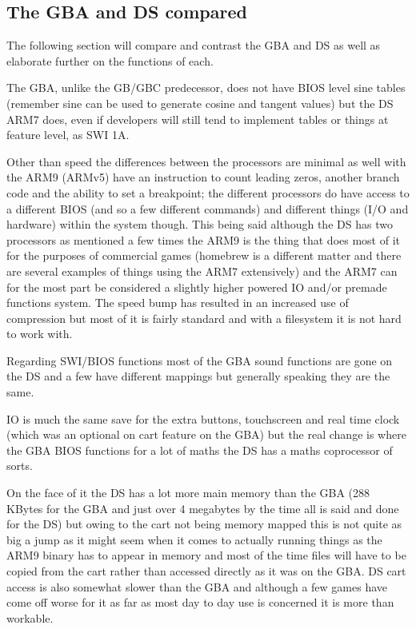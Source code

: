 \documentclass[
]{book}
\begin{document}
\hypertarget{the-gba-and-ds-compared}{%
\subsection{The GBA and DS compared}\label{the-gba-and-ds-compared}}

The following section will compare and contrast the GBA and DS as well as elaborate further on the functions of each.

The GBA, unlike the GB/GBC predecessor, does not have BIOS level sine tables (remember sine can be used to generate cosine and tangent values) but the DS ARM7 does, even if developers will still tend to implement tables or things at feature level, as SWI 1A.

Other than speed the differences between the processors are minimal as well with the ARM9 (ARMv5) have an instruction to count leading zeros, another branch code and the ability to set a breakpoint; the different processors do have access to a different BIOS (and so a few different commands) and different things (I/O and hardware) within the system though. This being said although the DS has two processors as mentioned a few times the ARM9 is the thing that does most of it for the purposes of commercial games (homebrew is a different matter and there are several examples of things using the ARM7 extensively) and the ARM7 can for the most part be considered a slightly higher powered IO and/or premade functions system. The speed bump has resulted in an increased use of compression but most of it is fairly standard and with a filesystem it is not hard to work with.

Regarding SWI/BIOS functions most of the GBA sound functions are gone on the DS and a few have different mappings but generally speaking they are the same.

IO is much the same save for the extra buttons, touchscreen and real time clock (which was an optional on cart feature on the GBA) but the real change is where the GBA BIOS functions for a lot of maths the DS has a maths coprocessor of sorts.

On the face of it the DS has a lot more main memory than the GBA (288 KBytes for the GBA and just over 4 megabytes by the time all is said and done for the DS) but owing to the cart not being memory mapped this is not quite as big a jump as it might seem when it comes to actually running things as the ARM9 binary has to appear in memory and most of the time files will have to be copied from the cart rather than accessed directly as it was on the GBA. DS cart access is also somewhat slower than the GBA and although a few games have come off worse for it as far as most day to day use is concerned it is more than workable.
\end{document}
